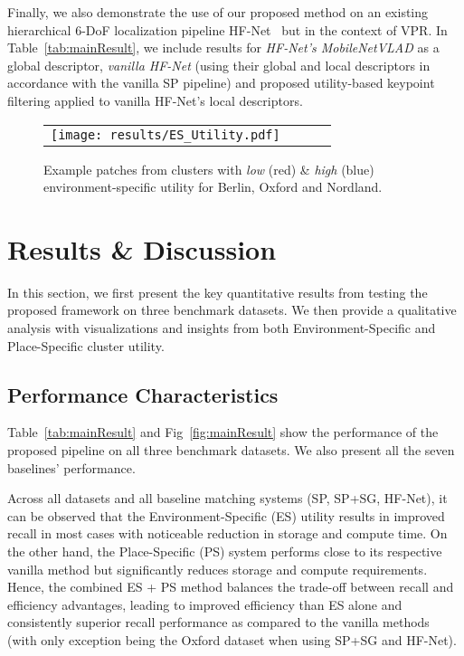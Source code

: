 \documentclass[letterpaper, 10 pt, conference]{ieeeconf}  \fi
\begin{document}
Finally, we also demonstrate the use of our proposed method on an existing hierarchical 6-DoF localization pipeline HF-Net~\cite{sarlin2019coarse} but in the context of VPR. In Table~\ref{tab:mainResult}, we include results for \textit{HF-Net's MobileNetVLAD} as a global descriptor, \textit{vanilla HF-Net} (using their global and local descriptors in accordance with the vanilla SP pipeline) and proposed utility-based keypoint filtering applied to vanilla HF-Net's local descriptors.


\begin{figure}
\centering
\begin{tabular}{cccc}
\texttt{[image: results/ES\_Utility.pdf]} \\
\end{tabular}
\caption{Example patches from clusters with \textit{low} (red) \& \textit{high} (blue) environment-specific utility for Berlin, Oxford and Nordland.}
\label{fig:ES}
\end{figure}


\section{Results \& Discussion}

In this section, we first present the key quantitative results from testing the proposed framework on three benchmark datasets. We then provide a qualitative analysis with visualizations and insights from both Environment-Specific and Place-Specific cluster utility.

\subsection{Performance Characteristics}
\label{sec:Quant}

Table~\ref{tab:mainResult} and Fig~\ref{fig:mainResult} show the performance of the proposed pipeline on all three benchmark datasets. We also present all the seven baselines' performance.

Across all datasets and all baseline matching systems (SP, SP+SG, HF-Net), it can be observed that the Environment-Specific (ES) utility results in improved recall in most cases with noticeable reduction in storage and compute time. On the other hand, the Place-Specific (PS) system performs close to its respective vanilla method but significantly reduces storage and compute requirements. Hence, the combined ES + PS method balances the trade-off between recall and efficiency advantages, leading to improved efficiency than ES alone and consistently superior recall performance as compared to the vanilla methods (with only exception being the Oxford dataset when using SP+SG and HF-Net).
\end{document}
